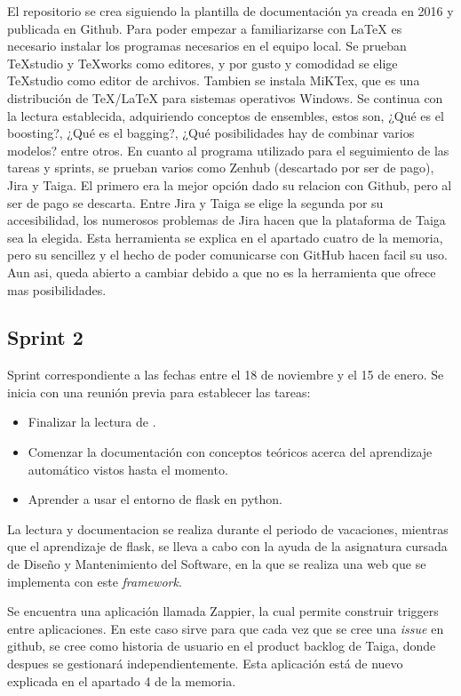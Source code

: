 El repositorio se crea siguiendo la plantilla de documentación ya creada en 2016 y publicada en Github. Para poder empezar a familiarizarse con \LaTeX{} es necesario instalar los programas necesarios en el equipo local. Se prueban TeXstudio y TeXworks como editores, y por gusto y comodidad se elige TeXstudio como editor de archivos. Tambien se instala MiKTex, que es una distribución de TeX/LaTeX para sistemas operativos Windows.
Se continua con la lectura establecida, adquiriendo conceptos de ensembles, estos son, ¿Qué es el boosting?, ¿Qué es el bagging?, ¿Qué posibilidades hay de combinar varios modelos? entre otros.
En cuanto al programa utilizado para el seguimiento de las tareas y sprints, se prueban varios como Zenhub (descartado por ser de pago), Jira y Taiga. El primero era la mejor opción dado su relacion con Github, pero al ser de pago se descarta. Entre Jira y Taiga se elige la segunda por su accesibilidad, los numerosos problemas de Jira hacen que la plataforma de Taiga sea la elegida.
Esta herramienta se explica en el apartado cuatro de la memoria, pero su sencillez y el hecho de poder comunicarse con GitHub hacen facil su uso. Aun asi, queda abierto a cambiar debido a que no es la herramienta que ofrece mas posibilidades.
\subsection{Sprint 2}
Sprint correspondiente a las fechas entre el 18 de noviembre y el 15 de enero. Se inicia con una reunión previa para establecer las tareas: 
\begin{itemize}
	\item Finalizar la lectura de \cite{ensembles}.
	\item Comenzar la documentación con conceptos teóricos acerca del aprendizaje automático vistos hasta el momento.
	\item  Aprender a usar el entorno de flask en python.
\end{itemize}

La lectura y documentacion se realiza durante el periodo de vacaciones, mientras que el aprendizaje de flask, se lleva a cabo con la ayuda de la asignatura cursada de Diseño y Mantenimiento del Software, en la que se realiza una web que se implementa con este \textit{framework}.

Se encuentra una aplicación llamada Zappier, la cual permite construir triggers entre aplicaciones. En este caso sirve para que cada vez que se cree una \textit{issue} en github, se cree como historia de usuario en el product backlog de Taiga, donde despues se gestionará independientemente. Esta aplicación está de nuevo explicada en el apartado 4 de la memoria. 
